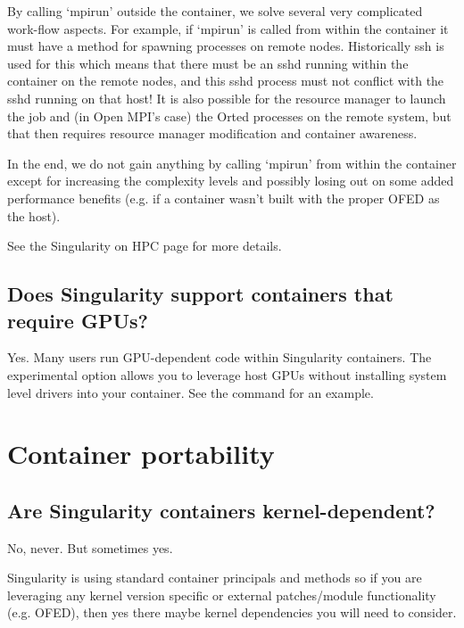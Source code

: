 \documentclass[letterpaper,10pt,english]{sphinxmanual}
\begin{document}
By calling ‘mpirun’ outside the container, we solve several very complicated work-flow aspects. For example, if ‘mpirun’ is called from within the container it must have a method for spawning processes on remote nodes. Historically ssh is used for this which means that there must be an sshd running within the container on the remote nodes, and this sshd process must not conflict with the sshd running on that host! It is also possible for the resource manager to launch the job and (in Open MPI’s case) the Orted processes on the remote system, but that then requires resource manager modification and container awareness.

In the end, we do not gain anything by calling ‘mpirun’ from within the container except for increasing the complexity levels and possibly losing out on some added performance benefits (e.g. if a container wasn’t built with the proper OFED as the host).

See the Singularity on HPC page for more details.


\subsection{Does Singularity support containers that require GPUs?}
\label{\detokenize{faq:does-singularity-support-containers-that-require-gpus}}
Yes. Many users run GPU-dependent code within Singularity containers. The experimental  option allows you to leverage host GPUs without installing system level drivers into your container. See the {\hyperref[\detokenize{appendix:exec-command}]{}} command for an example.


\section{Container portability}
\label{\detokenize{faq:container-portability}}

\subsection{Are Singularity containers kernel-dependent?}
\label{\detokenize{faq:are-singularity-containers-kernel-dependent}}
No, never. But sometimes yes.

Singularity is using standard container principals and methods so if you are leveraging any kernel version specific or external patches/module functionality (e.g. OFED), then yes there maybe kernel dependencies you will need to consider.
\end{document}
